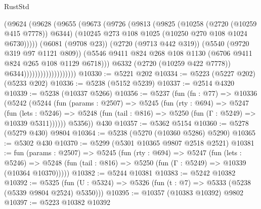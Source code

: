 \begin{lexlean}{RustStd}
\begin{coremodule}
                                    (@9624
                                      (@9628
                                        (@9655
                                          (@9673
                                            (@9726
                                              (@9813
                                                (@9825
                                                  (@10258 (@2720 (@10259 @415 @7778)) @6344)
                                                  (@10245
                                                    @273
                                                    @108
                                                    @1025
                                                    (@10250 @270 @108 @1024 @6730)))))
                                            (@6081 (@9708 @23))
                                            (@2720 (@9713 @442 @319))
                                            (@5540 (@9720 @319 @97 @1121 @809))
                                            (@5546
                                              @9411
                                              @824
                                              @268
                                              @108
                                              @1130
                                              (@6706 @9411 @824 @265 @108 @1129 @6718)))
                                          @6332
                                          (@2720 (@10259 @422 @7778))
                                          @6344)))))))))))))))))))
@10330 := @5221 @202
@10334 := @5223 (@5227 @202) (@5233 @202)
@10336 := @5238 (@5152 @5239)
@10337 := @2514 @4320
@10339 := @5238 (@10337 @5266)
@10356 := @5237
    (fun (fn : @77) =>
    @10336
      (@5242
        (@5244
          (fun (params : @2507) =>
          @5245
            (fun (rty : @694) =>
            @5247
              (fun (lets : @5246) =>
              @5248 (fun (tail : @816) => @5250 (fun (Γ : @5249) => @10339 @5311))))))
        @5356))
    @430
@10357 := @5362 @5154
@10360 := @5278 (@5279 @430) @9804
@10364 := @5238 (@5270 (@10360 @5286) @5290)
@10365 := @5302 @430
@10370 := @5299 (@5301 @10365 @9807 @2518 @2521)
@10381 := fun (params : @2507) =>
  @5245
    (fun (rty : @694) =>
    @5247
      (fun (lets : @5246) =>
      @5248 (fun (tail : @816) => @5250 (fun (Γ : @5249) => @10339 (@10364 @10370)))))
@10382 := @5244 @10381
@10383 := @5242 @10382
@10392 := @5325 (fun (U : @5324) => @5326 (fun (t : @7) => @5333 (@5238 (@5339 @9804 @2524) @5350)))
@10395 := @10357 (@10383 @10392) @9802
@10397 := @5223 @10382 @10392

\end{coremodule}
\end{lexlean}
